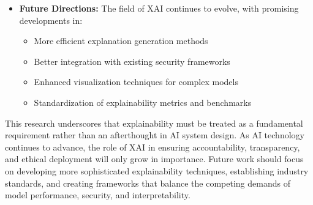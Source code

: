 \documentclass[12pt]{article}
\begin{document}
\begin{itemize}[noitemsep]
  \item \textbf{Future Directions:} The field of XAI continues to evolve, with promising developments in:
    \begin{itemize}
      \item More efficient explanation generation methods
      \item Better integration with existing security frameworks
      \item Enhanced visualization techniques for complex models
      \item Standardization of explainability metrics and benchmarks
    \end{itemize}
\end{itemize}

This research underscores that explainability must be treated as a fundamental requirement rather than an afterthought in AI system design. As AI technology continues to advance, the role of XAI in ensuring accountability, transparency, and ethical deployment will only grow in importance. Future work should focus on developing more sophisticated explainability techniques, establishing industry standards, and creating frameworks that balance the competing demands of model performance, security, and interpretability.

\end{document}
